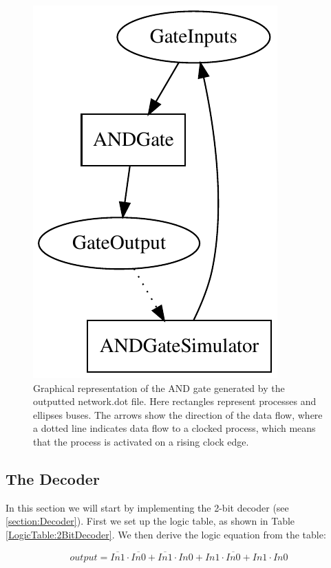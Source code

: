         \begin{figure}[h!]
                \centering
                \includegraphics{pictures/ANDGate.pdf}
                \caption{Graphical representation of the AND gate generated by the outputted network.dot file. Here rectangles represent processes and ellipses buses. The arrows show the direction of the data flow, where a dotted line indicates data flow to a clocked process, which means that the process is activated on a rising clock edge.}
                \label{fig:ANDGateDOTFile}
            
        \end{figure} 
    
    \subsection{The Decoder}
        In this section we will start by implementing the 2-bit decoder (see \ref{section:Decoder}). First we set up the logic table, as shown in Table \ref{LogicTable:2BitDecoder}. We then derive the logic equation from the table: 
        
        \begin{equation}
        \label{Eq:2Bitdecoder}
            output = \overline{In1} \cdot \overline{In0} + \overline{In1} \cdot In0 + In1 \cdot \overline{In0} + In1 \cdot In0
        \end{equation}
        
